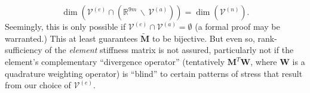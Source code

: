 \documentclass[12pt]{article}
\begin{document}
\begin{itemize}
        \begin{equation}
                \dim(\mathcal{V}^{(e)} \cap (\mathbb{R}^{9m} \, \backslash \, \mathcal{V}^{(a)})) = \dim(\mathcal{V}^{(n)}).
        \end{equation}
        Seemingly, this is only possible if $\mathcal{V}^{(e)} \cap \mathcal{V}^{(a)} = \emptyset$ (a formal proof may be warranted.) This at least guarantees $\tilde{\mathbf{M}}$ to be bijective. But even so, rank-sufficiency of the \textit{element} stiffness matrix is not assured, particularly not if the element's complementary ``divergence operator'' (tentatively $\mathbf{M}^T \mathbf{W}$, where $\mathbf{W}$ is a quadrature weighting operator) is ``blind'' to certain patterns of stress that result from our choice of $\mathcal{V}^{(e)}$.

        \newpage


\end{itemize}
\end{document}
